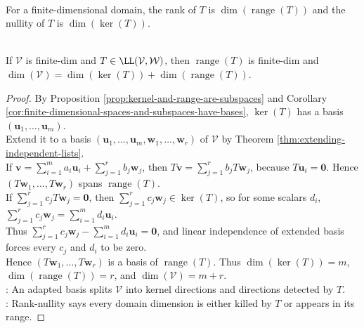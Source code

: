 \begin{definition} \label{def:rank-and-nullity-linear-map} \\
For a finite-dimensional domain, the rank of $T$ is $\dim(\operatorname{range}(T))$ and the nullity of $T$ is $\dim(\ker(T))$.
\end{definition}

\begin{theorem} \label{thm:rank-nullity} \\
If $\mathcal{V}$ is finite-dim and $T \in \LL(\mathcal{V}, \mathcal{W})$, then $\operatorname{range}(T)$ is finite-dim and $\dim(\mathcal{V}) = \dim(\ker(T)) + \dim(\operatorname{range}(T))$.
\begin{proof}
By Proposition \ref{prop:kernel-and-range-are-subspaces} and Corollary \ref{cor:finite-dimensional-spaces-and-subspaces-have-bases}, $\ker(T)$ has a basis $(\mathbf{u}_1,\ldots,\mathbf{u}_m)$.\\
Extend it to a basis $(\mathbf{u}_1,\ldots,\mathbf{u}_m,\mathbf{w}_1,\ldots,\mathbf{w}_r)$ of $\mathcal{V}$ by Theorem \ref{thm:extending-independent-lists}.\\
If $\mathbf{v}=\sum\limits_{i=1}^m a_i\mathbf{u}_i+\sum\limits_{j=1}^r b_j\mathbf{w}_j$, then $T\mathbf{v}=\sum\limits_{j=1}^r b_jT\mathbf{w}_j$, because $T\mathbf{u}_i=\mathbf{0}$. Hence $(T\mathbf{w}_1,\ldots,T\mathbf{w}_r)$ spans $\operatorname{range}(T)$.\\
If $\sum\limits_{j=1}^r c_jT\mathbf{w}_j=\mathbf{0}$, then $\sum\limits_{j=1}^r c_j\mathbf{w}_j\in\ker(T)$, so for some scalars $d_i$, $\sum\limits_{j=1}^r c_j\mathbf{w}_j=\sum\limits_{i=1}^m d_i\mathbf{u}_i$.\\
Thus $\sum\limits_{j=1}^r c_j\mathbf{w}_j-\sum\limits_{i=1}^m d_i\mathbf{u}_i=\mathbf{0}$, and linear independence of extended basis forces every $c_j$ and $d_i$ to be zero.\\
Hence $(T\mathbf{w}_1,\ldots,T\mathbf{w}_r)$ is a basis of $\operatorname{range}(T)$. Thus $\dim(\ker(T))=m$, $\dim(\operatorname{range}(T))=r$, and $\dim(\mathcal{V})=m+r$.\\
: An adapted basis splits $\mathcal{V}$ into kernel directions and directions detected by $T$.\\
: Rank-nullity says every domain dimension is either killed by $T$ or appears in its range.
\end{proof}
\end{theorem}


